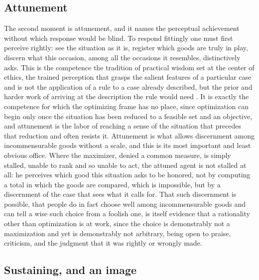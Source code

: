 \subsection*{Attunement}

The second moment is attunement, and it names the perceptual achievement without which response would be blind. To respond fittingly one must first perceive rightly: see the situation as it is, register which goods are truly in play, discern what this occasion, among all the occasions it resembles, distinctively asks. This is the competence the tradition of practical wisdom set at the center of ethics, the trained perception that grasps the salient features of a particular case and is not the application of a rule to a case already described, but the prior and harder work of arriving at the description the rule would need \parencite{nussbaum1986fragility}. It is exactly the competence for which the optimizing frame has no place, since optimization can begin only once the situation has been reduced to a feasible set and an objective, and attunement is the labor of reaching a sense of the situation that precedes that reduction and often resists it. Attunement is what allows discernment among incommensurable goods without a scale, and this is its most important and least obvious office. Where the maximizer, denied a common measure, is simply stalled, unable to rank and so unable to act, the attuned agent is not stalled at all: he perceives which good this situation asks to be honored, not by computing a total in which the goods are compared, which is impossible, but by a discernment of the case that sees what it calls for. That such discernment is possible, that people do in fact choose well among incommensurable goods and can tell a wise such choice from a foolish one, is itself evidence that a rationality other than optimization is at work, since the choice is demonstrably not a maximization and yet is demonstrably not arbitrary, being open to praise, criticism, and the judgment that it was rightly or wrongly made.

\subsection*{Sustaining, and an image}

